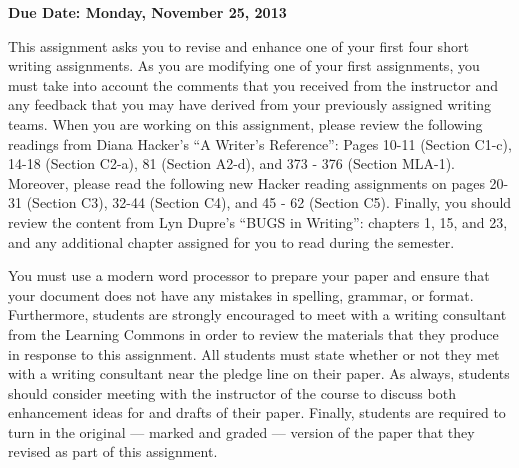 

\usepackage[compact]{titlesec}



\vspace*{-.2in}
\begin{center}
	{\bf Due Date: Monday, November 25, 2013}
\end{center}	

This assignment asks you to revise and enhance one of your first four short writing assignments. As you are modifying
one of your first assignments, you must take into account the comments that you received from the instructor and any
feedback that you may have derived from your previously assigned writing teams. When you are working on this
assignment, please review the following readings from Diana Hacker's ``A Writer's Reference'': Pages 10-11 (Section
C1-c), 14-18 (Section C2-a), 81 (Section A2-d), and 373 - 376 (Section MLA-1). Moreover, please read the following new
Hacker reading assignments on pages 20-31 (Section C3), 32-44 (Section C4), and 45 - 62 (Section C5). Finally, you
should review the content from Lyn Dupre's ``BUGS in Writing'': chapters 1, 15, and 23, and any additional
chapter assigned for you to read during the semester.

You must use a modern word processor to prepare your paper and ensure that your document does not have any mistakes in
spelling, grammar, or format. Furthermore, students are strongly encouraged to meet with a writing consultant from the
Learning Commons in order to review the materials that they produce in response to this assignment. All students must
state whether or not they met with a writing consultant near the pledge line on their paper. As always, students
should consider meeting with the instructor of the course to discuss both enhancement ideas for and drafts of their paper. Finally,
students are required to turn in the original --- marked and graded --- version of the paper that they revised as part
of this assignment.



